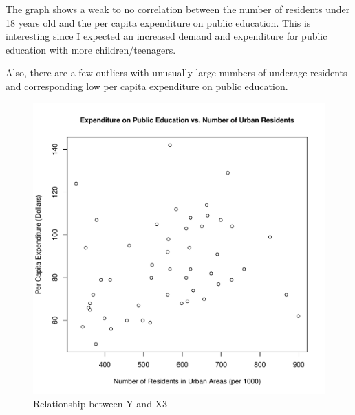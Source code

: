 \documentclass[12pt,letterpaper]{article}
\begin{document}
\begin{itemize}


\noindent The graph shows a weak to no correlation between the number of residents under 18 years old and the per capita expenditure on public education. This is interesting since I expected an increased demand and expenditure for public education with more children/teenagers. 

\vspace{0.5cm}

\noindent Also, there are a few outliers with unusually large numbers of underage residents and corresponding low per capita expenditure on public education.

\newpage
\begin{figure} [h]
	\centering
	\includegraphics[width=0.7\linewidth]{Graph2}
	\caption{Relationship between Y and X3}
	\label{fig:graph3}
\end{figure}




\end{itemize}
\end{document}
